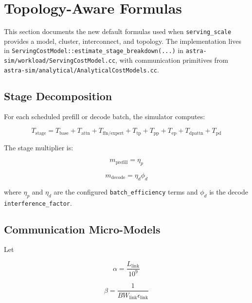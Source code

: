 \section{Topology-Aware Formulas}

This section documents the new default formulas used when
\texttt{serving\_scale} provides a model, cluster, interconnect, and topology.
The implementation lives in
\texttt{ServingCostModel::estimate\_stage\_breakdown(...)} in
\texttt{astra-sim/workload/ServingCostModel.cc}, with communication primitives
from \texttt{astra-sim/analytical/AnalyticalCostModels.cc}.

\subsection{Stage Decomposition}

For each scheduled prefill or decode batch, the simulator computes:

\begin{equation*}
T_{\mathrm{stage}} =
T_{\mathrm{base}} +
T_{\mathrm{attn}} +
T_{\mathrm{ffn/expert}} +
T_{\mathrm{tp}} +
T_{\mathrm{pp}} +
T_{\mathrm{ep}} +
T_{\mathrm{dpattn}} +
T_{\mathrm{pd}}
\end{equation*}

The stage multiplier is:

\begin{equation*}
m_{\mathrm{prefill}} = \eta_p
\end{equation*}

\begin{equation*}
m_{\mathrm{decode}} = \eta_d \phi_d
\end{equation*}

where \(\eta_p\) and \(\eta_d\) are the configured
\texttt{batch\_efficiency} terms and \(\phi_d\) is the decode
\texttt{interference\_factor}.

\subsection{Communication Micro-Models}

Let

\begin{equation*}
\alpha = \frac{L_{\mathrm{link}}}{10^9}
\end{equation*}

\begin{equation*}
\beta = \frac{1}{BW_{\mathrm{link}} \epsilon_{\mathrm{link}}}
\end{equation*}

